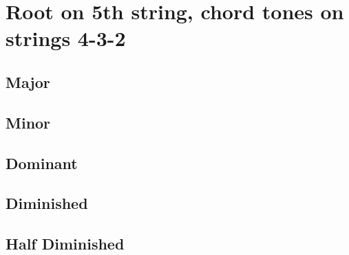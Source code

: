 \section{Root on 5th string, chord tones on strings 4-3-2}

\subsection{Major}

\subsection{Minor}

\subsection{Dominant}

\subsection{Diminished}

\subsection{Half Diminished}
